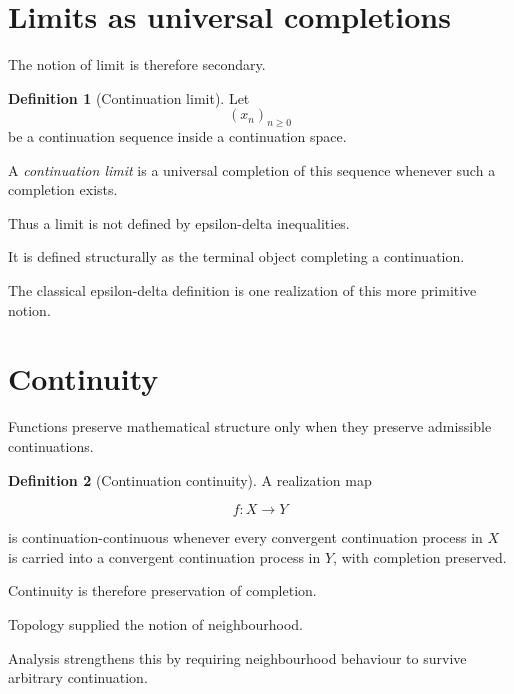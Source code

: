 \documentclass[13pt,openany]{book}
\theoremstyle{plain}
\theoremstyle{definition}
\newtheorem{definition}{Definition}[chapter]
\begin{document}
\section{Limits as universal completions}

The notion of limit is therefore secondary.

\begin{definition}[Continuation limit]
Let
\[
(x_n)_{n\ge0}
\]
be a continuation sequence inside a continuation space.

A \emph{continuation limit} is a universal completion of this sequence whenever
such a completion exists.
\end{definition}

Thus a limit is not defined by epsilon-delta inequalities.

It is defined structurally as the terminal object completing a continuation.

The classical epsilon-delta definition is one realization of this more
primitive notion.

\section{Continuity}

Functions preserve mathematical structure only when they preserve admissible
continuations.

\begin{definition}[Continuation continuity]
A realization map

\[
f:X\rightarrow Y
\]

is continuation-continuous whenever every convergent continuation process in
\(X\) is carried into a convergent continuation process in \(Y\), with
completion preserved.
\end{definition}

Continuity is therefore preservation of completion.

Topology supplied the notion of neighbourhood.

Analysis strengthens this by requiring neighbourhood behaviour to survive
arbitrary continuation.

\end{document}
